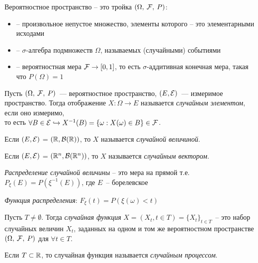 \begin{definition}
    Вероятностное пространство -- это тройка $(\Omega,\: \mathcal{F},\: P)$:
    \begin{itemize}[noitemsep, topsep=1pt]
        \item[$\Omega$] -- произвольное непустое множество, элементы которого -- это элементарными исходами
        \item[$\mathcal{F}$] -- $\sigma$-алгебра подмножеств $\Omega$, называемых (случайными) событиями
        \item[$\mathcal{P}$] -- вероятностная мера $\mathcal{F} \to [0,1]$, то есть $\sigma$-аддитивная конечная мера, такая что $P(\Omega) = 1$
    \end{itemize}
\end{definition}

\begin{definition}
    Пусть $(\Omega,\: \mathcal{F},\: P)$~--- вероятностное пространство, $(E, \mathcal{E})$~--- измеримое пространство. Тогда отображение $X : \Omega \rightarrow E$ называется \textit{случайным элементом}, если оно измеримо,\\
    то есть $\forall B \in \mathcal{E} \hookrightarrow X^{-1}(B) = \{ \omega: X(\omega) \in B \} \in \mathcal{F}$.
\end{definition}

Если $(E, \mathcal{E})$ = $(\mathbb{R}, \mathcal{B}(\mathbb{R}))$, то $X$ называется \textit{случайной величиной}.

Если $(E, \mathcal{E})$ = $(\mathbb{R}^n, \mathcal{B}(\mathbb{R}^n))$, то $X$ называется \textit{случайным вектором}.

\begin{definition}
    \textit{Распределение случайной величины} -- это мера на прямой т.е. $P_\xi(E) = P(\xi^{-1}(E))$, где $E$~-- борелевское
\end{definition}

\begin{definition}
    \textit{Функция распределения}: $F_\xi(t) = P(\xi(\omega)<t)$
\end{definition}

\begin{definition}
    Пусть $T\neq \emptyset$. Тогда \textit{случайная функция} $X = (X_t, t\in T)= \{X_t\}_{t\in T}$~-- это набор случайных величин $X_t$, заданных на одном и том же вероятностном пространстве $(\Omega,\: \mathcal{F},\: P)$ для $\forall t\in T$.
\end{definition}

\begin{definition}
    Если $T \subset \mathbb{R}$, то случайная функция называется \textit{случайным процессом}.
\end{definition}

